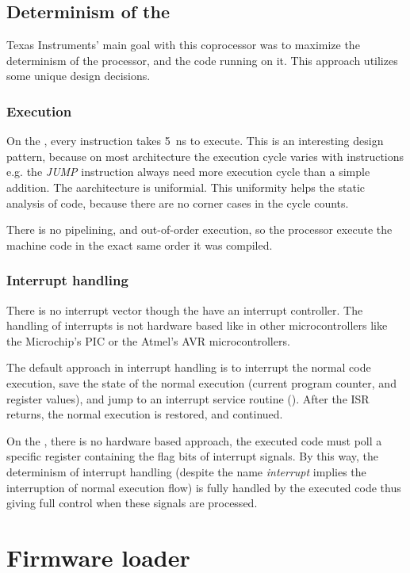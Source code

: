 \subsection{Determinism of the \pru}

Texas Instruments' main goal with this coprocessor was to maximize the determinism of the processor, and the code running on it. This approach utilizes some unique design decisions.

\subsubsection{Execution}

On the \pru, every instruction takes \SI{5}{\nano\second} to execute. This is an interesting design pattern, because on most architecture the execution cycle varies with instructions e.g. the \emph{JUMP} instruction always need more execution cycle than a simple addition. The \pru aarchitecture is uniformial. This uniformity helps the static analysis of code, because there are no corner cases in the cycle counts.

There is no pipelining, and out-of-order execution, so the processor execute the machine code in the exact same order it was compiled.

\subsubsection{Interrupt handling}

There is no interrupt vector though the \pruss have an interrupt controller. The handling of interrupts is not hardware based like in other microcontrollers like the Microchip's PIC or the Atmel's AVR microcontrollers.

The default approach in interrupt handling is to interrupt the normal code execution, save the state of the normal execution (current program counter, and register values), and jump to an interrupt service routine (). After the ISR returns, the normal execution is restored, and continued.

On the \pru, there is no hardware based approach, the executed code must poll a specific register containing the flag bits of interrupt signals. By this way, the determinism of interrupt handling (despite the name \emph{interrupt} implies the interruption of normal execution flow) is fully handled by the executed code thus giving full control when these signals are processed.

\section{Firmware loader}

